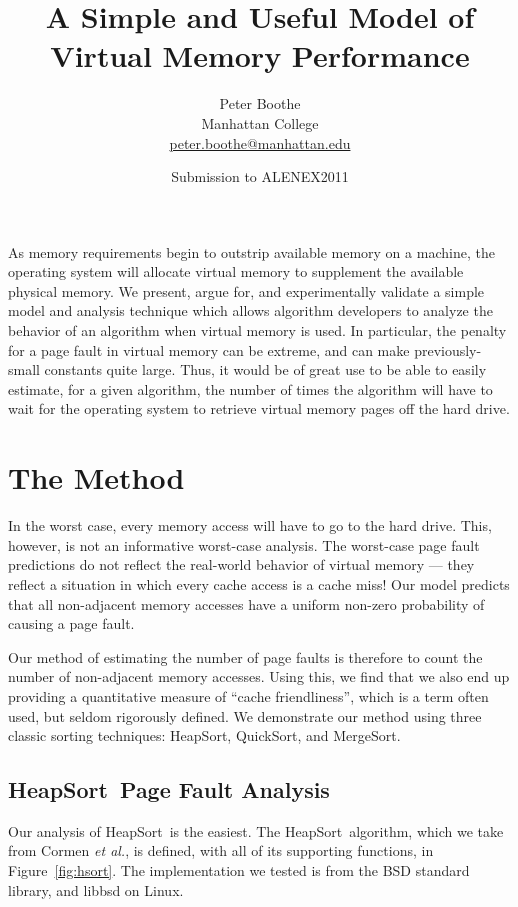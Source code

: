 \documentclass[11pt]{article}
\title{A Simple and Useful Model of Virtual Memory Performance}
\author{Peter Boothe\\
Manhattan College\\
\url{peter.boothe@manhattan.edu}
}
\date{Submission to ALENEX2011}
\newcommand{\heapsort}{{\sc HeapSort}}
\newcommand{\quicksort}{{\sc QuickSort}}
\newcommand{\mergesort}{{\sc MergeSort}}
\begin{document}
\maketitle

As memory requirements begin to outstrip available memory on a machine, the
operating system will allocate virtual memory to supplement the available
physical memory.  We present, argue for, and experimentally validate a simple
model and analysis technique which allows algorithm developers to analyze the
behavior of an algorithm when virtual memory is used.  In particular, the
penalty for a page fault in virtual memory can be extreme, and can make
previously-small constants quite large. Thus, it would be of great use to be
able to easily estimate, for a given algorithm, the number of times the
algorithm will have to wait for the operating system to retrieve virtual memory
pages off the hard drive.

\section{The Method}

In the worst case, every memory access will have to go to the hard drive.
This, however, is not an informative worst-case analysis.  The worst-case page
fault predictions do not reflect the real-world behavior of virtual memory ---
they reflect a situation in which every cache access is a cache miss! Our
model predicts that all non-adjacent memory accesses have a uniform non-zero probability of causing a page fault. 

Our method of estimating the number of page faults is therefore to count the
number of non-adjacent memory accesses.  Using this, we find that we also end
up providing a quantitative measure of ``cache friendliness'', which is a term
often used, but seldom rigorously defined.  We demonstrate our method
using three classic sorting techniques: \heapsort, \quicksort, and \mergesort.


\subsection{\heapsort\ Page Fault Analysis}
Our analysis of \heapsort\ is the easiest.  The \heapsort\ algorithm, which we
take from Cormen {\it et al.}\cite{clrs}, is defined, with all of its
supporting functions, in Figure~\ref{fig:hsort}.  The implementation we tested
is from the BSD standard library, and libbsd on Linux.
\end{document}
